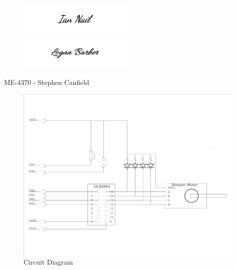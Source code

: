 \documentclass[a4paper,12pt]{article} %
\begin{document}
\maketitle %
\vspace{3cm}

\begin{figure}[h!]
\centering
    \includegraphics[width=0.5\textwidth]{IANsignature.png}
    \includegraphics[width=0.5\textwidth]{LOGANsignature.png}
  \end{figure}
\begin{center}
\vspace{3cm}
ME-4370 - Stephen Canfield
\end{center}
\pagebreak



\begin{figure}[h!]
  \center
  \includegraphics[width=\textwidth]{AutoCAD.pdf}
  \caption{Circuit Diagram}
\end{figure}
\end{document}
